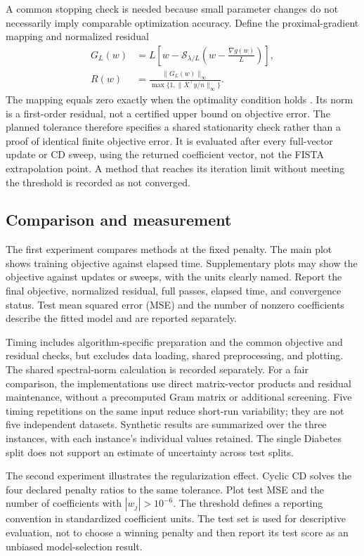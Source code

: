 \documentclass[11pt,a4paper]{article}
\newcommand{\soft}{\mathcal{S}}
\begin{document}
A common stopping check is needed because small parameter changes do not necessarily imply comparable optimization accuracy. Define the proximal-gradient mapping and normalized residual
\begin{align}
G_L(w)&=L\left[w-\soft_{\lambda/L}
                  \left(w-\frac{\nabla g(w)}{L}\right)\right],\\
R(w)&=\frac{\|G_L(w)\|_\infty}
{\max\{1,\|X^\top y/n\|_\infty\}}.
\label{eq:residual}
\end{align}
The mapping equals zero exactly when the optimality condition holds \cite{parikh2014}. Its norm is a first-order residual, not a certified upper bound on objective error. The planned tolerance therefore specifies a shared stationarity check rather than a proof of identical finite objective error. It is evaluated after every full-vector update or CD sweep, using the returned coefficient vector, not the FISTA extrapolation point. A method that reaches its iteration limit without meeting the threshold is recorded as not converged.

\subsection{Comparison and measurement}
The first experiment compares methods at the fixed penalty. The main plot shows training objective against elapsed time. Supplementary plots may show the objective against updates or sweeps, with the units clearly named. Report the final objective, normalized residual, full passes, elapsed time, and convergence status. Test mean squared error (MSE) and the number of nonzero coefficients describe the fitted model and are reported separately.

Timing includes algorithm-specific preparation and the common objective and residual checks, but excludes data loading, shared preprocessing, and plotting. The shared spectral-norm calculation is recorded separately. For a fair comparison, the implementations use direct matrix-vector products and residual maintenance, without a precomputed Gram matrix or additional screening. Five timing repetitions on the same input reduce short-run variability; they are not five independent datasets. Synthetic results are summarized over the three instances, with each instance's individual values retained. The single Diabetes split does not support an estimate of uncertainty across test splits.

The second experiment illustrates the regularization effect. Cyclic CD solves the four declared penalty ratios to the same tolerance. Plot test MSE and the number of coefficients with $|w_j|>10^{-6}$. The threshold defines a reporting convention in standardized coefficient units. The test set is used for descriptive evaluation, not to choose a winning penalty and then report its test score as an unbiased model-selection result.
\end{document}
